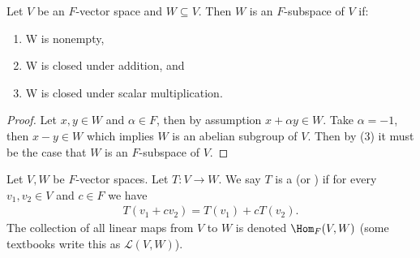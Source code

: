     \begin{lemma}
        Let $V$ be an $F$-vector space and $W \subseteq V$. Then $W$ is an $F$-subspace of $V$ if:
            \begin{enumerate}[label = (\arabic*)]
                \item W is nonempty,
                \item W is closed under addition, and
                \item W is closed under scalar multiplication.
            \end{enumerate}
    \end{lemma}
        \begin{proof}
            Let $x,y \in W$ and $\alpha \in F$, then by assumption $x+\alpha y \in W$. Take $\alpha = -1$, then $x-y \in W$ which implies $W$ is an abelian subgroup of $V$. Then by (3) it must be the case that $W$ is an $F$-subspace of $V$.
        \end{proof}

    \begin{definition}
        Let $V,W$ be $F$-vector spaces. Let $T:V \rightarrow W$. We say $T$ is a \newline {} (or ) if for every $v_1,v_2 \in V$ and $c \in F$ we have
            \begin{equation*}
            \begin{split}
                T(v_1 + c v_2) = T(v_1) + c T(v_2).
            \end{split}
            \end{equation*}
        The collection of all linear maps from $V$ to $W$ is denoted $\Hom_{F}{(V,W)}$ (some textbooks write this as $\mathcal{L}(V,W)$).
    \end{definition}

